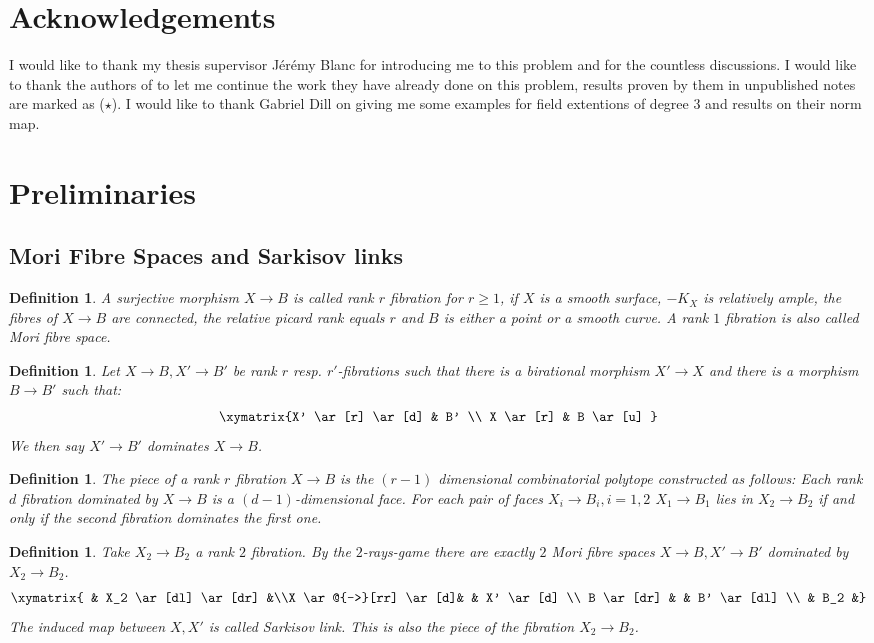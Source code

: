 \documentclass[12pt, oneside, reqno]{amsart}
\newtheorem{definition}[theorem]{Definition}
\begin{document}
\section*{Acknowledgements}
\noindent I would like to thank my thesis supervisor Jérémy Blanc for introducing me to this problem and for the countless discussions. I would like to thank the authors of \cite{BSY} to let me continue the work they have already done on this problem, results proven by them in unpublished notes are marked as ($\star$). I would like to thank Gabriel Dill on giving me some examples for field extentions of degree $3$ and results on their norm map. 
\section{Preliminaries}
\noindent
\subsection{Mori Fibre Spaces and Sarkisov links}
\begin{definition} \label{RankRFibration}
    A surjective morphism $X \rightarrow B$ is called rank $r$ fibration for $r \geq 1$, if $X$ is a smooth surface, $-K_X$ is relatively ample, the fibres of $X \rightarrow B$ are connected, the relative picard rank equals $r$ and $B$ is either a point or a smooth curve. A rank $1$ fibration is also called Mori fibre space.
\end{definition}

\begin{definition}
    Let $ X \rightarrow B, X' \rightarrow B'$ be rank $r$ resp. $r'$-fibrations such that there is a birational morphism $X' \rightarrow X$ and there is a morphism $B \rightarrow B'$ such that:
    \[\xymatrix{X' \ar[r] \ar[d] & B' \\ X \ar[r] & B \ar[u] }\]
    We then say $X' \rightarrow B'$ dominates $X \rightarrow B$.
\end{definition}
\begin{definition} \label{RPiece}
    The piece of a rank $r$ fibration $X \rightarrow B$ is the $(r-1)$ dimensional combinatorial polytope constructed as follows: Each rank $d$ fibration dominated by $X \rightarrow B$ is a $(d-1)$-dimensional face. For each pair of faces $X_i \rightarrow B_i, i=1,2$ $X_1 \rightarrow B_1$ lies in $X_2 \rightarrow B_2$ if and only if the second fibration dominates the first one.
\end{definition}
\begin{definition} \label{SarkisovLink}
    Take $X_2 \rightarrow B_2$ a rank $2$ fibration. By the $2$-rays-game there are exactly $2$ Mori fibre spaces $X \rightarrow B, X' \rightarrow B'$ dominated by $X_2 \rightarrow B_2$. 
    \[ \xymatrix{ & X_2 \ar[dl] \ar[dr] &\\X \ar@{-->}[rr] \ar[d]& & X' \ar[d] \\ B \ar[dr]  & & B' \ar[dl] \\ & B_2 &}\]
    The induced map between $X,X'$ is called Sarkisov link. This is also the piece of the fibration $X_2 \rightarrow B_2$.
\end{definition}
\end{document}
